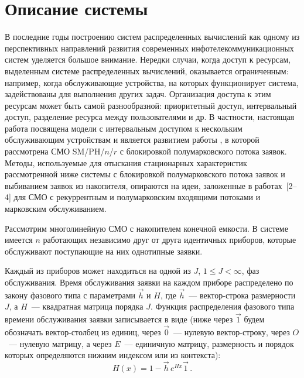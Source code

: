      \begin{multicols}{2}

      \label{st\stat}



\section{Описание системы}

В последние годы построению систем распределенных вычислений как
одному из перспективных направлений развития современных инфотелекоммуникационных систем
уделяется большое внимание.
Нередки случаи, когда доступ к ресурсам, выделенным системе распределенных вычислений, оказывается ограниченным:
например, когда обслуживающие устройства, на которых функционирует система,
задействованы для выполнения других задач.
Организация доступа к этим ресурсам может быть самой разнообразной:
приоритетный доступ, интервальный доступ, разделение ресурса между пользователями и др.
В частности, настоящая работа посвящена модели с интервальным доступом к
нескольким обслуживающим устройствам и является развитием работы \cite{C08},
в которой рассмотрена СМО SM/PH/$n$/$r$ с блокировкой полумарковского потока заявок.
Методы, используемые для отыскания стационарных характеристик рассмотренной ниже
системы с блокировкой полумарковского потока заявок
и выбиванием заявок из накопителя, опираются на идеи, заложенные в работах~[2--4]
для СМО с рекуррентным и полумарковским входящими потоками и марковским обслуживанием.

Рассмотрим многолинейную СМО с накопителем конечной емкости.
В системе имеется $n$ работающих независимо друг от друга идентичных приборов,
которые обслуживают поступающие на них однотипные заявки.

Каждый из приборов может находиться на одной из $J$, $1\le J <\infty$, фаз обслуживания.
Время обслуживания заявки на каждом приборе распределено
по закону фазового типа с параметрами $\vec h$ и $H$,
где $\vec h$~--- вектор-строка размерности $J$, а $H$~--- квадратная матрица порядка $J$.
Функция распределения фазового типа времени обслуживания заявки записывается в виде
(ниже через $\vec 1$ будем обозначать вектор-столбец из единиц, через $\vec 0$~--- нулевую вектор-строку,
через $O$~--- нулевую матрицу, а через $E$~--- единичную матрицу,
размерность и порядок которых определяются нижним индексом или из контекста):
\begin{equation}
\label{PH-Distribution}
H(x) = 1-\vec h\, e^{Hx} \vec1\,.
\end{equation}


\end{multicols}
